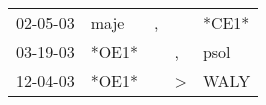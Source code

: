 \begin{supertabular}{p{0.07\textwidth}p{0.06\textwidth}p{0.02\textwidth}p{0.02\textwidth}p{0.06\textwidth}}
 02-05-03\textsuperscript{} &  maje\textsuperscript{} &  , &               &                   *CE1* \\
 03-19-03\textsuperscript{} &                   *OE1* &    &             , &  psol\textsuperscript{} \\
 12-04-03\textsuperscript{} &                   *OE1* &    &  \textgreater &  WALY\textsuperscript{} \\
\end{supertabular}
